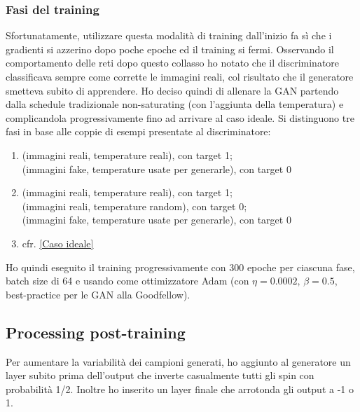 \documentclass[a4paper]{article}
\begin{document}
\subsubsection{Fasi del training}
Sfortunatamente, utilizzare questa modalità di training dall'inizio fa sì che i gradienti si azzerino dopo poche epoche ed il training si fermi. Osservando il comportamento delle reti dopo questo collasso ho notato che il discriminatore classificava sempre come corrette le immagini reali, col risultato che il generatore smetteva subito di apprendere. Ho deciso quindi di allenare la GAN partendo dalla schedule tradizionale non-saturating (con l'aggiunta della temperatura) e complicandola progressivamente fino ad arrivare al caso ideale.
Si distinguono tre fasi in base alle coppie di esempi presentate al discriminatore:
\begin{enumerate}[label=\Alph*:]
\item (immagini reali, temperature reali), con target 1;\\(immagini fake, temperature usate per generarle), con target 0
\item (immagini reali, temperature reali), con target 1;\\(immagini reali, temperature random), con target 0;\\(immagini fake, temperature usate per generarle), con target 0
\item cfr. \ref{Caso ideale}
\end{enumerate}
Ho quindi eseguito il training progressivamente con 300 epoche per ciascuna fase, batch size di 64 e usando come ottimizzatore Adam \cite{adam} (con $\eta=0.0002,\,\beta=0.5$, best-practice per le GAN alla Goodfellow).
\subsection{Processing post-training}
Per aumentare la variabilità dei campioni generati, ho aggiunto al generatore un layer subito prima dell'output che inverte casualmente tutti gli spin con probabilità 1/2. Inoltre ho inserito un layer finale che arrotonda gli output a -1 o 1.
\end{document}
